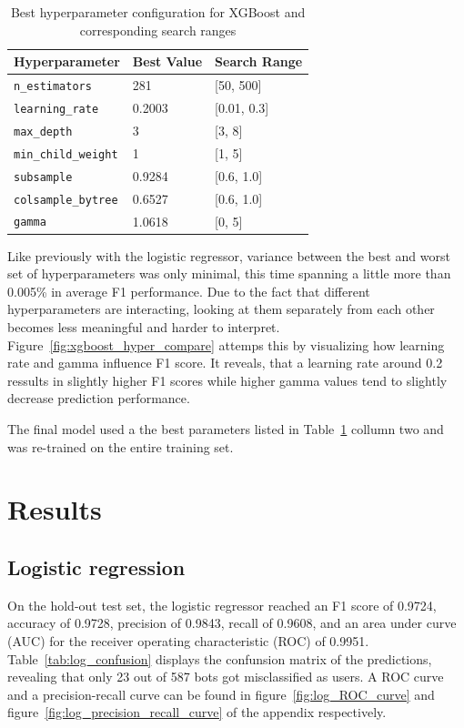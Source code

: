 \documentclass[twocolumn]{article}
\begin{document}
\begin{table}[H]
\centering
\caption{Best hyperparameter configuration for XGBoost and corresponding search ranges}
\label{tab:xgb_best_params}
\begin{tabular}{lll}
\toprule
\textbf{Hyperparameter} & \textbf{Best Value} & \textbf{Search Range} \\
\midrule
\texttt{n\_estimators}       & 281     & [50, 500] \\
\texttt{learning\_rate}      & 0.2003  & [0.01, 0.3] \\
\texttt{max\_depth}          & 3       & [3, 8] \\
\texttt{min\_child\_weight}  & 1       & [1, 5] \\
\texttt{subsample}          & 0.9284  & [0.6, 1.0] \\
\texttt{colsample\_bytree}   & 0.6527  & [0.6, 1.0] \\
\texttt{gamma}              & 1.0618  & [0, 5] \\
\bottomrule
\end{tabular}
\end{table}

Like previously with the logistic regressor, variance between the best and worst set of hyperparameters was only minimal, this time spanning a little more than 0.005\% in average F1 performance. Due to the fact that different hyperparameters are interacting, looking at them separately from each other becomes less meaningful and harder to interpret. Figure~\ref{fig:xgboost_hyper_compare} attemps this by visualizing how learning rate and gamma influence F1 score. It reveals, that a learning rate around 0.2 ressults in slightly higher F1 scores while higher gamma values tend to slightly decrease prediction performance.

The final model used a the best parameters listed in Table~\ref{tab:xgb_best_params} collumn two and was re-trained on the entire training set.

\section{Results}

\subsection{Logistic regression}
On the hold-out test set, the logistic regressor reached an F1 score of 0.9724, accuracy of 0.9728, precision of 0.9843, recall of 0.9608, and an area under curve (AUC) for the receiver operating characteristic (ROC) of 0.9951. Table~\ref{tab:log_confusion} displays the confunsion matrix of the predictions, revealing that only 23 out of 587 bots got misclassified as users. A ROC curve and a precision-recall curve can be found in figure~\ref{fig:log_ROC_curve} and figure~\ref{fig:log_precision_recall_curve} of the appendix respectively.
\end{document}
